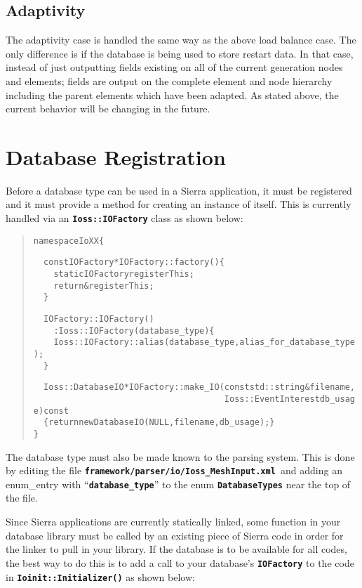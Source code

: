 \documentclass[11pt,twoside]{article}
\newcommand{\code}[1]
   {\mbox{\bf\tt #1}\null}
\newenvironment{source}
{\small\begin{quote}\begin{alltt}}
{\end{alltt}\end{quote}\normalsize}
\begin{document}
\subsection{Adaptivity}
The adaptivity case is handled the same way as the above load balance
case. The only difference is if the database is being used to store
restart data. In that case, instead of just outputting fields existing
on all of the current generation nodes and elements; fields are output
on the complete element and node hierarchy including the parent
elements which have been adapted. As stated above, the current behavior
will be changing in the future.

\section{Database Registration}
Before a database type can be used in a Sierra application, it must be
registered and it must provide a method for creating an instance of
itself. This is currently handled via an
\code{Ioss::IOFactory} class as shown below:

\begin{source}
 namespace IoXX \{

 \ \ const IOFactory* IOFactory::factory()\{
 \ \ \ \ static IOFactory registerThis;
 \ \ \ \ return \&registerThis;
 \ \ \}

 \ \ IOFactory::IOFactory()
 \ \ \ \ : Ioss::IOFactory({\textquotedbl}database\_type{\textquotedbl}) \{
 \ \ \ \ Ioss::IOFactory::alias({\textquotedbl}database\_type{\textquotedbl}, {\textquotedbl}alias\_for\_database\_type{\textquotedbl});
 \ \ \}

 \ \ Ioss::DatabaseIO* IOFactory::make\_IO(const std::string\& filename,
 \ \ \ \ \ \ \ \ \ \ \ \ \ \ \ \ \ \ \ \ \ \ \ \ \ \ \ \ \ \ \ \ \ \ \ \ \ \ Ioss::EventInterest db\_usage) const
 \ \ \{ return new DatabaseIO(NULL, filename, db\_usage); \}
 \}
\end{source}
The database type must also be made known to the parsing system. This is
done by editing the file
\code{framework/parser/io/Ioss\_MeshInput.xml }and adding an
enum\_entry with ``\code{database\_type}'' to the enum
\code{DatabaseTypes} near the top of the file.

Since Sierra applications are currently statically linked, some function
in your database library must be called by an existing piece of Sierra
code in order for the linker to pull in your library. If the database
is to be available for all codes, the best way to do this is to add a
call to your database's \code{IOFactory} to the code in
\code{Ioinit::Initializer()} as shown below:
\end{document}
